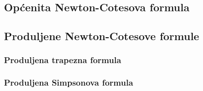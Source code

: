 \subsection{Općenita Newton-Cotesova formula}

\subsection{Produljene Newton-Cotesove formule}

\subsubsection{Produljena trapezna formula}
\subsubsection{Produljena Simpsonova formula}
